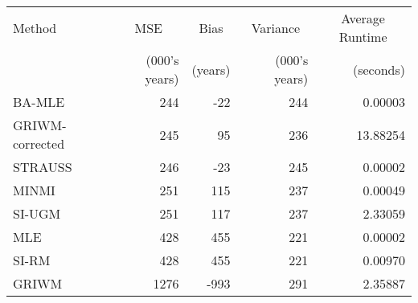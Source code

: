 
\begin{tabular}{lrrrr}
\toprule
\multicolumn{1}{l}{Method} & \multicolumn{1}{c}{MSE} & \multicolumn{1}{c}{Bias} & \multicolumn{1}{c}{Variance} & \multicolumn{1}{c}{Average Runtime} \\
 & (000's years) & (years) & (000's years) & (seconds)\\
\midrule
BA-MLE & 244 & -22 & 244 & 0.00003\\
GRIWM-corrected & 245 & 95 & 236 & 13.88254\\
STRAUSS & 246 & -23 & 245 & 0.00002\\
MINMI & 251 & 115 & 237 & 0.00049\\
SI-UGM & 251 & 117 & 237 & 2.33059\\
\addlinespace
MLE & 428 & 455 & 221 & 0.00002\\
SI-RM & 428 & 455 & 221 & 0.00970\\
GRIWM & 1276 & -993 & 291 & 2.35887\\
\bottomrule
\end{tabular}
